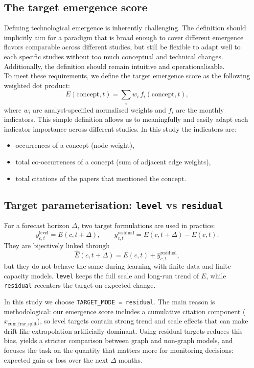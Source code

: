 \documentclass{article}
\begin{document}
\subsection{The target emergence score}
Defining technological emergence is inherently challenging.
The definition should implicitly aim for a paradigm that is broad enough to cover different emergence flavors comparable across different studies, but still be flexible to adapt well to each specific studies without too much conceptual and technical changes.
Additionally, the definition should remain intuitive and operationalisable.\\
To meet these requirements, we define the target emergence score as the following weighted dot product:
\[
E(\text{concept}, t) = \sum_{i} w_i \, f_i(\text{concept}, t),
\]
where $w_i$ are analyst-specified normalised weights and $f_i$ are the monthly indicators. This simple definition allows us to meaningfully and easily adapt each indicator importance across different studies. In this study the indicators are:
\begin{itemize}
    \item occurrences of a concept (node weight),
    \item total co-occurrences of a concept (sum of adjacent edge weights),
    \item total citations of the papers that mentioned the concept.
\end{itemize} 

\subsection{Target parameterisation: \texttt{level} vs \texttt{residual}}
For a forecast horizon \(\Delta\), two target formulations are used in practice:
\[
y^{\text{level}}_{c,t}=E(c,t+\Delta),
\qquad
y^{\text{residual}}_{c,t}=E(c,t+\Delta)-E(c,t).
\]
They are bijectively linked through
\[
\widehat{E}(c,t+\Delta)=E(c,t)+\widehat{y}^{\text{residual}}_{c,t},
\]
but they do not behave the same during learning with finite data and finite-capacity models. \texttt{level} keeps the full scale and long-run trend of \(E\), while \texttt{residual} recenters the target on expected change.

In this study we choose \texttt{TARGET\_MODE = residual}.
The main reason is methodological: our emergence score includes a cumulative citation component (\(x_{\text{cum\_frac\_split}}\)), so level targets contain strong trend and scale effects that can make drift-like extrapolation artificially dominant.
Using residual targets reduces this bias, yields a stricter comparison between graph and non-graph models, and focuses the task on the quantity that matters more for monitoring decisions: expected gain or loss over the next \(\Delta\) months.
\end{document}
